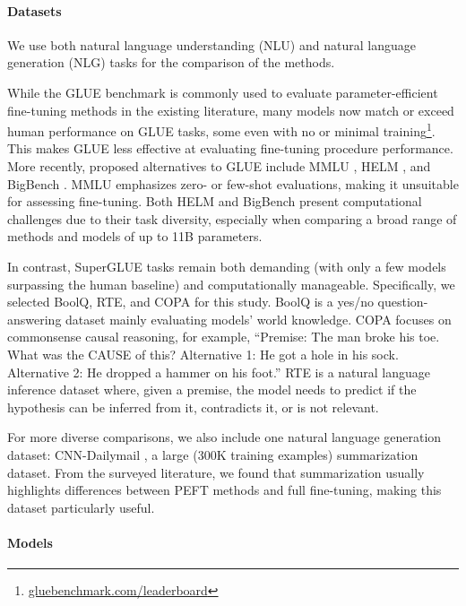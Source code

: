 \paragraph{Datasets}

We use both natural language understanding (NLU) and natural language generation (NLG) tasks for the comparison of the methods.

While the GLUE benchmark \citep{wang2018glue} is commonly used to evaluate parameter-efficient fine-tuning methods in the existing literature, many models now match or exceed human performance on GLUE tasks, some even with no or minimal training\footnote{\href{https://gluebenchmark.com/leaderboard}{gluebenchmark.com/leaderboard}}. This makes GLUE less effective at evaluating fine-tuning procedure performance. More recently, proposed alternatives to GLUE include MMLU \citep{hendrycks2021measuring}, HELM \citep{liang2023holistic}, and BigBench \citep{srivastava2022imitation}. MMLU emphasizes zero- or few-shot evaluations, making it unsuitable for assessing fine-tuning. Both HELM and BigBench present computational challenges due to their task diversity, especially when comparing a broad range of methods and models of up to 11B parameters.

In contrast, SuperGLUE tasks remain both demanding (with only a few models surpassing the human baseline) and computationally manageable. Specifically, we selected BoolQ, RTE, and COPA for this study. BoolQ is a yes/no question-answering dataset mainly evaluating models' world knowledge. COPA focuses on commonsense causal reasoning, for example, ``Premise: The man broke his toe. What was the CAUSE of this? Alternative 1: He got a hole in his sock. Alternative 2: He dropped a hammer on his foot.'' RTE is a natural language inference dataset where, given a premise, the model needs to predict if the hypothesis can be inferred from it, contradicts it, or is not relevant.

For more diverse comparisons, we also include one natural language generation dataset: CNN-Dailymail \citep{cnn_dailymail}, a large (300K training examples) summarization dataset. From the surveyed literature, we found that summarization usually highlights differences between PEFT methods and full fine-tuning, making this dataset particularly useful.

\paragraph{Models}

